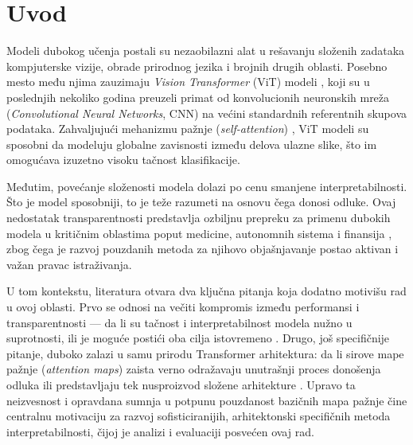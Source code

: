 \section{Uvod}

Modeli dubokog učenja postali su nezaobilazni alat u rešavanju složenih zadataka kompjuterske vizije, 
obrade prirodnog jezika i brojnih drugih oblasti. Posebno mesto među njima zauzimaju 
\textit{Vision Transformer} (ViT) modeli \cite{dosovitskiy2021vit}, koji su u poslednjih nekoliko 
godina preuzeli primat od konvolucionih neuronskih mreža (\textit{Convolutional Neural Networks}, CNN) 
na većini standardnih referentnih skupova podataka. Zahvaljujući mehanizmu pažnje 
(\textit{self-attention}) \cite{vaswani2017attention}, ViT modeli su sposobni da modeluju globalne 
zavisnosti između delova ulazne slike, što im omogućava izuzetno visoku tačnost klasifikacije.

Međutim, povećanje složenosti modela dolazi po cenu smanjene interpretabilnosti. Što je model sposobniji, to je teže razumeti na osnovu čega donosi odluke. Ovaj nedostatak transparentnosti predstavlja ozbiljnu prepreku za primenu dubokih modela u kritičnim oblastima poput medicine, autonomnih sistema i finansija \cite{samek2019explainable}, zbog čega je razvoj pouzdanih metoda za njihovo objašnjavanje postao aktivan i važan pravac istraživanja.

U tom kontekstu, literatura otvara dva ključna pitanja koja dodatno motivišu rad u ovoj oblasti. Prvo se odnosi na večiti kompromis između performansi i transparentnosti — da li su tačnost i interpretabilnost modela nužno u suprotnosti, ili je moguće postići oba cilja istovremeno \cite{samek2019explainable}. Drugo, još specifičnije pitanje, duboko zalazi u samu prirodu Transformer arhitektura: da li sirove mape pažnje (\textit{attention maps}) zaista verno odražavaju unutrašnji proces donošenja odluka ili predstavljaju tek nusproizvod složene arhitekture \cite{jain2019attention, wiegreffe2019attention}. Upravo ta neizvesnost i opravdana sumnja u potpunu pouzdanost bazičnih mapa pažnje čine centralnu motivaciju za razvoj sofisticiranijih, arhitektonski specifičnih metoda interpretabilnosti, čijoj je analizi i evaluaciji posvećen ovaj rad.

